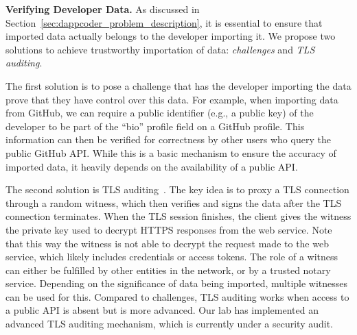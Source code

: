\textbf{Verifying Developer Data.}
As discussed in Section~\ref{sec:dappcoder_problem_description}, it is essential to ensure that imported data actually belongs to the developer importing it.
We propose two solutions to achieve trustworthy importation of data: \textit{challenges} and \textit{TLS auditing}.

The first solution is to pose a challenge that has the developer importing the data prove that they have control over this data.
For example, when importing data from GitHub, we can require a public identifier (e.g., a public key) of the developer to be part of the \enquote{bio} profile field on a GitHub profile.
This information can then be verified for correctness by other users who query the public GitHub API.
While this is a basic mechanism to ensure the accuracy of imported data, it heavily depends on the availability of a public API.

The second solution is TLS auditing~\cite{tlsnotary2014whitepaper}.
The key idea is to proxy a TLS connection through a random witness, which then verifies and signs the data after the TLS connection terminates.
When the TLS session finishes, the client gives the witness the private key used to decrypt HTTPS responses from the web service.
Note that this way the witness is not able to decrypt the request made to the web service, which likely includes credentials or access tokens.
The role of a witness can either be fulfilled by other entities in the network, or by a trusted notary service.
Depending on the significance of data being imported, multiple witnesses can be used for this.
Compared to challenges, TLS auditing works when access to a public API is absent but is more advanced.
Our lab has implemented an advanced TLS auditing mechanism, which is currently under a security audit.

